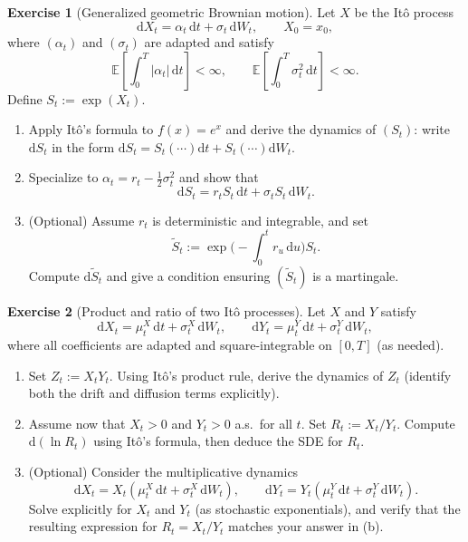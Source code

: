 \documentclass[11pt]{article}
\newcommand{\E}{\mathbb{E}}
\newcommand{\1}{\mathbf{1}}
\theoremstyle{definition}
\newtheorem{exercise}{Exercise}[section]
\begin{document}
\begin{exercise}[Generalized geometric Brownian motion]
Let $X$ be the It\^o process
$$
\mathrm{d} X_t = \alpha_t\,\mathrm{d} t + \sigma_t\,\mathrm{d} W_t,\qquad X_0=x_0,
$$
where $(\alpha_t)$ and $(\sigma_t)$ are adapted and satisfy
$$
\E\!\left[\int_0^T |\alpha_t|\,\mathrm{d} t\right]<\infty,
\qquad
\E\!\left[\int_0^T \sigma_t^2\,\mathrm{d} t\right]<\infty.
$$
Define $S_t := \exp(X_t)$.
\begin{enumerate}[label=\textbf{(\alph*)}, itemsep=0.25em]
  \item Apply It\^o's formula to $f(x)=e^x$ and derive the dynamics of $(S_t)$:
  write $\mathrm{d} S_t$ in the form $\mathrm{d} S_t = S_t(\cdots)\mathrm{d} t + S_t(\cdots)\mathrm{d} W_t$.
  \item Specialize to $\alpha_t = r_t - \tfrac12\sigma_t^2$ and show that
  $$
    \mathrm{d} S_t = r_t S_t\,\mathrm{d} t + \sigma_t S_t\,\mathrm{d} W_t.
  $$
  \item (Optional) Assume $r_t$ is deterministic and integrable, and set
  $$
    \widetilde S_t := \exp\!\Big(-\int_0^t r_u\,\mathrm{d} u\Big)S_t.
  $$
  Compute $\mathrm{d}\widetilde S_t$ and give a condition ensuring $(\widetilde S_t)$ is a martingale.
\end{enumerate}
\end{exercise}


\begin{exercise}[Product and ratio of two It\^o processes]
Let $X$ and $Y$ satisfy
$$
\mathrm{d} X_t = \mu^X_t\,\mathrm{d} t + \sigma^X_t\,\mathrm{d} W_t,
\qquad
\mathrm{d} Y_t = \mu^Y_t\,\mathrm{d} t + \sigma^Y_t\,\mathrm{d} W_t,
$$
where all coefficients are adapted and square-integrable on $[0,T]$ (as needed).
\begin{enumerate}[label=\textbf{(\alph*)}, itemsep=0.25em]
  \item Set $Z_t:=X_tY_t$. Using It\^o's product rule, derive the dynamics of $Z_t$
  (identify both the drift and diffusion terms explicitly).
  \item Assume now that $X_t>0$ and $Y_t>0$ a.s.\ for all $t$. Set $R_t:=X_t/Y_t$.
  Compute $\mathrm{d}(\ln R_t)$ using It\^o's formula, then deduce the SDE for $R_t$.
  \item (Optional) Consider the multiplicative dynamics
  $$
    \mathrm{d} X_t = X_t(\mu^X_t\,\mathrm{d} t + \sigma^X_t\,\mathrm{d} W_t),
    \qquad
    \mathrm{d} Y_t = Y_t(\mu^Y_t\,\mathrm{d} t + \sigma^Y_t\,\mathrm{d} W_t).
  $$
  Solve explicitly for $X_t$ and $Y_t$ (as stochastic exponentials), and verify that the resulting expression
  for $R_t=X_t/Y_t$ matches your answer in (b).
\end{enumerate}
\end{exercise}
\end{document}
